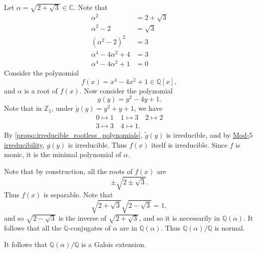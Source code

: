 \documentclass[notoc,notitlepage]{tufte-book}
\begin{document}
\begin{eg}
  Let $\alpha = \sqrt{2 + \sqrt{3}} \in \mathbb{C}$. Note that
  \begin{align*}
    \alpha^2                  & = 2 + \sqrt{3} \\
    \alpha^2 - 2              & = \sqrt{3} \\
    (\alpha^2 - 2)^2          & = 3 \\
    \alpha^4 - 4 \alpha^2 + 4 & = 3 \\
    \alpha^4 - 4 \alpha^2 + 1 & = 0
  \end{align*}
  Consider the polynomial
  \begin{equation*}
    f(x) = x^4 - 4x^2 + 1 \in \mathbb{Q}[x],
  \end{equation*}
  and $\alpha$ is a root of $f(x)$. Now consider the polynomial
  \begin{equation*}
    g(y) = y^2 - 4y + 1.
  \end{equation*}
  Note that in $\mathbb{Z}_5$, under $\tilde{g}(y) = y^2 + y + 1$, we have
  \begin{gather*}
    0 \mapsto 1 \quad 1 \mapsto 3 \quad 2 \mapsto 2 \\
    3 \mapsto 3 \quad 4 \mapsto 1.
  \end{gather*}
  By \cref{propo:irreducible_rootless_polynomials}, $\tilde{g}(y)$ is
  irreducible, and by \hyperref[propo:mod_p_irreducibility_test]{Mod-$5$
  irreducibility}, $g(y)$ is irreducible. Thus $f(x)$ itself is irreducible.
  Since $f$ is monic, it is the minimal polynomial of $\alpha$.

  Note that by construction, all the roots of $f(x)$ are
  \begin{equation*}
    \pm \sqrt{2 \pm \sqrt{3}}.
  \end{equation*}
  Thus $f(x)$ is separable. Note that
  \begin{equation*}
    \sqrt{2 + \sqrt{3}} \sqrt{2 - \sqrt{3}} = 1,
  \end{equation*}
  and so $\sqrt{2 - \sqrt{3}}$ is the inverse of $\sqrt{2 + \sqrt{3}}$, and so
  it is necessarily in $\mathbb{Q}(\alpha)$. It follows that all the
  $\mathbb{Q}$-conjugates of $\alpha$ are in $\mathbb{Q}(\alpha)$. Thus
  $\mathbb{Q}(\alpha) / \mathbb{Q}$ is normal.

  It follows that $\mathbb{Q}(\alpha) / \mathbb{Q}$ is a Galois extension.


\end{eg}
\end{document}
